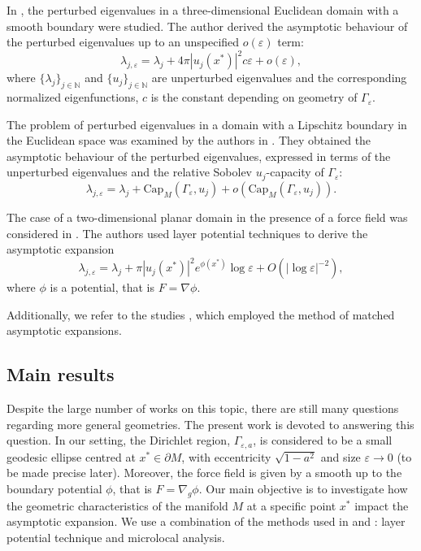 \documentclass[12pt,a4paper]{amsart}
\numberwithin{equation}{section}
\theoremstyle{plain}
\theoremstyle{definition}
\begin{document}
	In \cite{Cherdantsev}, the perturbed eigenvalues in a three-dimensional Euclidean domain with a smooth boundary were studied. The author derived the asymptotic behaviour of the perturbed eigenvalues up to an unspecified $o(\varepsilon)$ term:
	\begin{equation*}
		\lambda_{j,\varepsilon} = \lambda_j + 4\pi |u_j(x^*)|^2 c\varepsilon + o(\varepsilon),
	\end{equation*}
	where $\{\lambda_j\}_{j\in \mathbb{N}}$ and $\{u_j\}_{j\in \mathbb{N}}$ are unperturbed eigenvalues and the corresponding normalized eigenfunctions, $c$ is the constant depending on geometry of $\Gamma_\varepsilon$.
	
	The problem of perturbed eigenvalues in a domain with a Lipschitz boundary in the Euclidean space was examined by the authors in \cite{FelliNorisOgnibene}. They obtained the asymptotic behaviour of the perturbed eigenvalues, expressed in terms of the unperturbed eigenvalues and the relative Sobolev $u_j$-capacity of $\Gamma_\varepsilon$:
	\begin{equation*}
		\lambda_{j,\varepsilon} = \lambda_j + \mathrm{Cap}_{M}(\Gamma_\varepsilon, u_j) + o\left(\mathrm{Cap}_{M}(\Gamma_\varepsilon, u_j)\right).
	\end{equation*}
	
	The case of a two-dimensional planar domain in the presence of a force field was considered in \cite{ammari}. The authors used layer potential techniques to derive the asymptotic expansion
    \begin{equation*}
		\lambda_{j,\varepsilon} = \lambda_j + \pi|u_j(x^*)|^2e^{\phi(x^*)}\log\varepsilon+O(|\log\varepsilon|^{-2}),
    \end{equation*}
    where $\phi$ is a potential, that is $F = \nabla \phi$.

    Additionally, we refer to the studies \cite{WardKeller,KolokolnikovTitcombeWard,CoombsStraubeWard,CheviakovWard,PaquinLefebvreIyaniwuraWard}, which employed the 
    method of matched asymptotic expansions.
	\subsection{Main results}
	Despite the large number of works on this topic, there are still many questions regarding more general geometries. The present work is devoted to answering this question. In our setting, the Dirichlet region, $\Gamma_{\varepsilon,a}$, is considered to be a small geodesic ellipse centred at $x^*\in\partial M$, with eccentricity $\sqrt{1 - a^2}$ and size $\varepsilon \rightarrow 0$ (to be made precise later). Moreover, the force field is given by a smooth up to the boundary potential $\phi$, that is $F=\nabla_g\phi$. Our main objective is to investigate how the geometric characteristics of the manifold $M$ at a specific point $x^*$ impact the asymptotic expansion. We use a combination of the methods used in \cite{ammari} and \cite{NursultanovTzouTzou}: layer potential technique and microlocal analysis.
	
\end{document}

